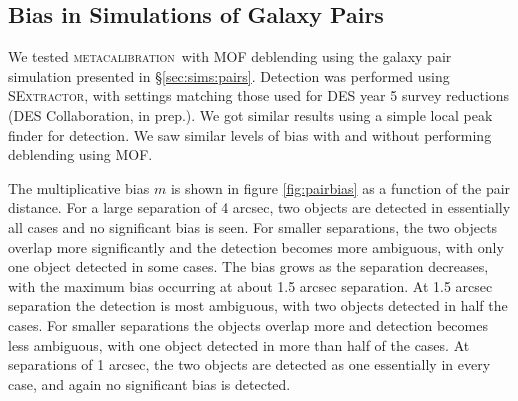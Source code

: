 \documentclass[fleqn,useAMS,usenatbib]{mnras}
\newcommand{\mcal}{\textsc{metacalibration}}
\newcommand{\sx}{\textsc{SExtractor}}
\begin{document}
\subsection{Bias in Simulations of Galaxy Pairs}

We tested \mcal\ with MOF deblending using the galaxy pair simulation presented
in \S \ref{sec:sims:pairs}. Detection was performed using \sx, with settings
matching those used for DES year 5 survey reductions (DES Collaboration, in prep.).
We got similar results using a simple local peak finder for detection.
We saw similar levels of bias with and without performing deblending using MOF.

The multiplicative bias $m$ is shown in figure \ref{fig:pairbias} as a function
of the pair distance. For a large separation of 4 arcsec, two objects are
detected in essentially all cases and no significant bias is seen.  For smaller
separations, the two objects overlap more significantly and the detection
becomes more ambiguous, with only one object detected in some cases.  The bias
grows as the separation decreases, with the maximum bias occurring at about 1.5
arcsec separation. At 1.5 arcsec separation the detection is most ambiguous,
with two objects detected in half the cases. For smaller separations the
objects overlap more and detection becomes less ambiguous, with one object
detected in more than half of the cases. At separations of 1 arcsec, the two
objects are detected as one essentially in every case, and again no significant
bias is detected.
\end{document}
